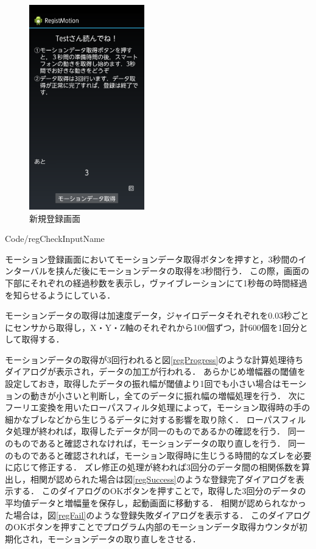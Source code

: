 \documentclass[12pt]{jreport}
\renewcommand{\slash}{/}
\begin{document}
\begin{figure}[tbhp]
            \begin{minipage}{0.32\hsize}
                \begin{center}
                    \includegraphics[width=5cm, bb=0 0 540 960]{Reg.pdf}
                \end{center}
                \caption{新規登録画面}
                \label{reg}
            \end{minipage}
        \end{figure}

        
        {Code\slash regCheckInputName}

        モーション登録画面においてモーションデータ取得ボタンを押すと，3秒間のインターバルを挟んだ後にモーションデータの取得を3秒間行う．
        この際，画面の下部にそれぞれの経過秒数を表示し，ヴァイブレーションにて1秒毎の時間経過を知らせるようにしている．

        モーションデータの取得は加速度データ，ジャイロデータそれぞれを0.03秒ごとにセンサから取得し，X・Y・Z軸のそれぞれから100個ずつ，計600個を1回分として取得する．

        モーションデータの取得が3回行われると図\ref{regProgress}のような計算処理待ちダイアログが表示され，データの加工が行われる．
        あらかじめ増幅器の閾値を設定しておき，取得したデータの振れ幅が閾値より1回でも小さい場合はモーションの動きが小さいと判断し，全てのデータに振れ幅の増幅処理を行う．
        次にフーリエ変換を用いたローパスフィルタ処理によって，モーション取得時の手の細かなブレなどから生じうるデータに対する影響を取り除く．
        ローパスフィルタ処理が終われば，取得したデータが同一のものであるかの確認を行う．
        同一のものであると確認されなければ，モーションデータの取り直しを行う．
        同一のものであると確認されれば，モーション取得時に生じうる時間的なズレを必要に応じて修正する．
        ズレ修正の処理が終われば3回分のデータ間の相関係数を算出し，相関が認められた場合は図\ref{regSuccess}のような登録完了ダイアログを表示する．
        このダイアログのOKボタンを押すことで，取得した3回分のデータの平均値データと増幅量を保存し，起動画面に移動する．
        相関が認められなかった場合は，図\ref{regFail}のような登録失敗ダイアログを表示する．
        このダイアログのOKボタンを押すことでプログラム内部のモーションデータ取得カウンタが初期化され，モーションデータの取り直しをさせる．
\end{document}
